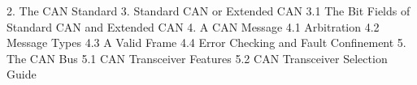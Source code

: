 2. The CAN Standard 
3. Standard CAN or Extended CAN 
3.1 The Bit Fields of Standard CAN and Extended CAN 
4. A CAN Message 
4.1 Arbitration 
4.2 Message Types 
4.3 A Valid Frame 
4.4 Error Checking and Fault Confinement 
5. The CAN Bus
5.1 CAN Transceiver Features
5.2 CAN Transceiver Selection Guide 